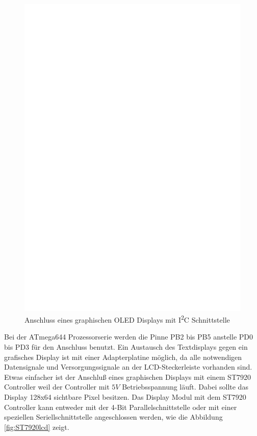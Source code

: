 \begin{figure}[H]
\centering
\includegraphics[width=14cm]{../FIG/SSD1306_I2C.eps}
\caption{Anschluss eines graphischen OLED Displays mit I\textsuperscript{2}C Schnittstelle}
\label{fig:ssd1306i2c}
\end{figure}

Bei der ATmega644 Prozessorserie werden die Pinne PB2 bis PB5 anstelle PD0 bis PD3 für den Anschluss benutzt.
Ein Austausch des Textdisplays gegen ein grafisches Display ist mit einer Adapterplatine möglich, da
alle notwendigen Datensignale und Versorgungssignale an der LCD-Steckerleiste vorhanden sind.
Etwas einfacher ist der Anschluß eines graphischen Displays mit einem ST7920 Controller weil 
der Controller mit \(5V\) Betriebsspannung läuft.
Dabei sollte das Display 128x64 sichtbare Pixel besitzen.
Das Display Modul mit dem ST7920 Controller kann entweder mit der 4-Bit Parallelschnittstelle oder mit einer 
speziellen Seriellschnittstelle angeschlossen werden, wie die Abbildung \ref{fig:ST7920lcd} zeigt.
 
